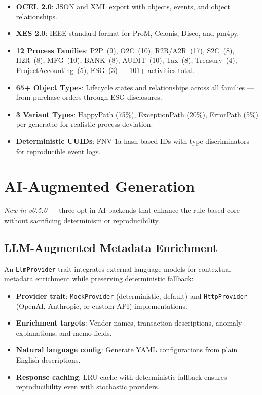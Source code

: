 \documentclass[11pt,a4paper]{article}
\begin{document}
\begin{itemize}[leftmargin=1.4em, itemsep=2pt]
  \item \textbf{OCEL 2.0}: JSON and XML export with objects, events, and object relationships.
  \item \textbf{XES 2.0}: IEEE standard format for ProM, Celonis, Disco, and pm4py.
  \item \textbf{12 Process Families}: P2P~(9), O2C~(10), R2R/A2R~(17), S2C~(8), H2R~(8), MFG~(10), BANK~(8), AUDIT~(10), Tax~(8), Treasury~(4), ProjectAccounting~(5), ESG~(3) --- 101+ activities total.
  \item \textbf{65+ Object Types}: Lifecycle states and relationships across all families --- from purchase orders through ESG disclosures.
  \item \textbf{3 Variant Types}: HappyPath (75\%), ExceptionPath (20\%), ErrorPath (5\%) per generator for realistic process deviation.
  \item \textbf{Deterministic UUIDs}: FNV-1a hash-based IDs with type discriminators for reproducible event logs.
\end{itemize}

\newpage
\section{AI-Augmented Generation}

\textit{New in v0.5.0} --- three opt-in AI backends that enhance the rule-based
core without sacrificing determinism or reproducibility.

\subsection{LLM-Augmented Metadata Enrichment}

An \texttt{LlmProvider} trait integrates external language models for
contextual metadata enrichment while preserving deterministic fallback:

\begin{itemize}[leftmargin=1.4em, itemsep=2pt]
  \item \textbf{Provider trait}: \texttt{MockProvider} (deterministic, default) and
        \texttt{HttpProvider} (OpenAI, Anthropic, or custom API) implementations.
  \item \textbf{Enrichment targets}: Vendor names, transaction descriptions,
        anomaly explanations, and memo fields.
  \item \textbf{Natural language config}: Generate YAML configurations from
        plain English descriptions.
  \item \textbf{Response caching}: LRU cache with deterministic fallback ensures
        reproducibility even with stochastic providers.
\end{itemize}
\end{document}
